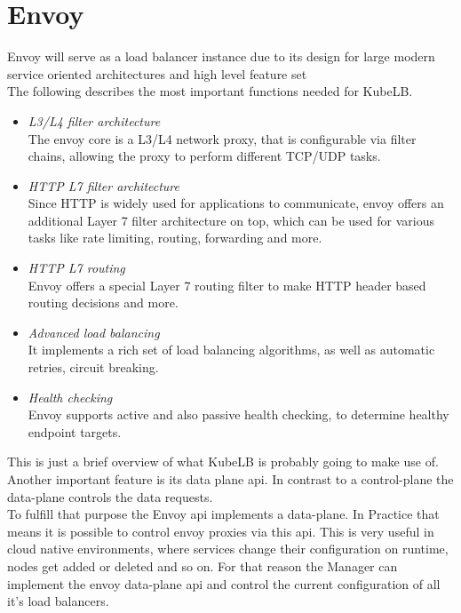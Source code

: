 \section{Envoy}

Envoy will serve as a load balancer instance due to its design for large modern service oriented architectures and high level feature set
\\
The following describes the most important functions needed for KubeLB.

\begin{itemize}
    \item \textit{L3/L4 filter architecture} \\
    The envoy core is a L3/L4 network proxy, that is configurable via filter chains, allowing the proxy to perform different TCP/UDP tasks.
    \item \textit{HTTP L7 filter architecture} \\
    Since HTTP is widely used for applications to communicate, envoy offers an additional Layer 7 filter architecture on top, which can be used for various tasks like rate limiting, routing, forwarding and more.
    \item \textit{HTTP L7 routing} \\
    Envoy offers a special Layer 7 routing filter to make HTTP header based routing decisions and more.
    \item \textit{Advanced load balancing} \\
    It implements a rich set of load balancing algorithms, as well as automatic retries, circuit breaking.
    \item \textit{Health checking} \\
    Envoy supports active and also passive health checking, to determine healthy endpoint targets.
\end{itemize}

This is just a brief overview of what KubeLB is probably going to make use of.~\cite{WHAT-IS-ENVOY}
\\
Another important feature is its data plane api.
In contrast to a control-plane the data-plane controls the data requests.
\\
To fulfill that purpose the Envoy api implements a data-plane.
In Practice that means it is possible to control envoy proxies via this api.
This is very useful in cloud native environments, where services change their configuration on runtime, nodes get added or deleted and so on.
For that reason the Manager can implement the envoy data-plane api and control the current configuration of all it's load balancers.
